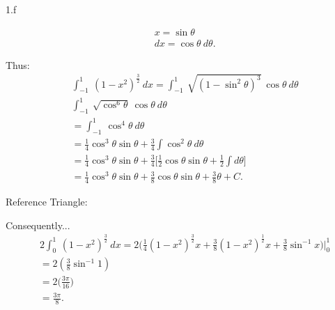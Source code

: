 \documentclass{report}
\begin{document}
    \pagebreak \bigbreak \noindent 
    1.f
    \bigbreak \noindent 
    \begin{minipage}[t]{0.47\textwidth}
        \begin{align*}
            &x= \sin{\theta } \\
            &dx = \cos{\theta }\ d\theta 
        .\end{align*} 
    \end{minipage}
    \begin{minipage}[t]{0.47\textwidth}
        Thus: 
        \begin{align*}
           &\int_{-1}^{1}\ (1-x^{2})^{\frac{3}{2}}\ dx = \int_{-1}^{1}\ \sqrt{(1-\sin^{2}{\theta })^{3}}\ \cos{\theta }\ d\theta  \\
           &\int_{-1}^{1}\ \sqrt{\cos^{6}{\theta }}\ \cos{\theta }\ d\theta \\
           &=\int_{-1}^{1}\ \cos^{4}{\theta }\ d\theta  \\
           &=\frac{1}{4}\cos^{3}{\theta }\sin{\theta} + \frac{3}{4}\int \cos^{2}{\theta }\ d\theta  \\
           &= \frac{1}{4}\cos^{3}{\theta }\sin{\theta }+\frac{3}{4}\bigg[\frac{1}{2}\cos{\theta }\sin{\theta } + \frac{1}{2}\int d\theta \bigg] \\
           &= \frac{1}{4}\cos^{3}{\theta }\sin{\theta }+\frac{3}{8}\cos{\theta }\sin{\theta }+\frac{3}{8}\theta  + C
        .\end{align*}
    \end{minipage}
    \bigbreak \noindent 
    \begin{minipage}[t]{0.4\textwidth}
        Reference Triangle: 
        \bigbreak \noindent 
    \end{minipage}
    \begin{minipage}[t]{0.47\textwidth}
        Consequently...
        \begin{align*}
           &2\int_{0}^{1}\ (1-x^{2})^{\frac{3}{2}}\ dx =  2\bigg(\frac{1}{4}(1-x^{2})^{\frac{3}{2}}x + \frac{3}{8}(1-x^{2})^{\frac{1}{2}}x +\frac{3}{8}\sin^{-1}{x}\bigg) \bigg|_0^{1}  \\
           &=2\left(\frac{3}{8}\sin^{-1}{1}\right) \\
           &=2\bigg(\frac{3\pi}{16}\bigg) \\
           &= \frac{3\pi}{8}
        .\end{align*}
    \end{minipage}
\end{document}
